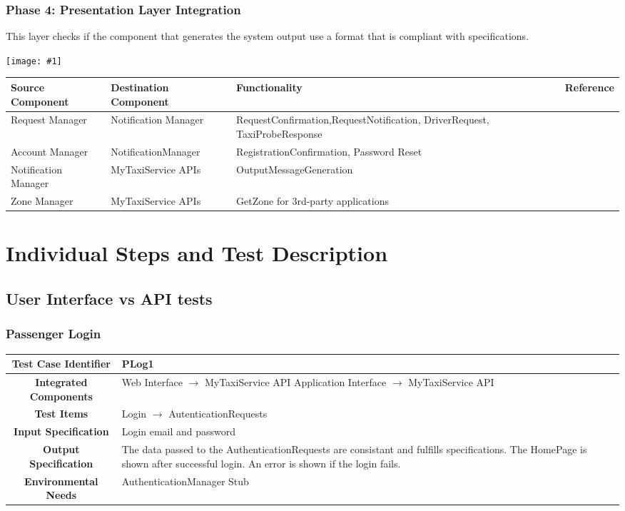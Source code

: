 \documentclass[11pt, a4paper,titlepage]{article}
\newcommand{\image}[1]{
	\begin{center}
		\noindent \texttt{[image: \#1]}
	\end{center}
}
\begin{document}
	\subsubsection{Phase 4: Presentation Layer Integration}
	This layer checks if the component that generates the system output use a format that is compliant with specifications.
	\newline
	\image{test_phase4.png}
	\begin{tabularx}{\textwidth}{| X |X |X |c|}
		\hline \textbf{Source Component} &\textbf{ Destination Component}&\textbf{Functionality} & \textbf{Reference} \\
		\hline Request Manager & Notification Manager & RequestConfirmation,\newline RequestNotification, DriverRequest,  TaxiProbeResponse & \\
		\hline Account Manager & NotificationManager & RegistrationConfirmation, Password Reset &\\
		\hline Notification Manager & MyTaxiService APIs & OutputMessageGeneration &\\
		\hline Zone Manager & MyTaxiService APIs & GetZone for 3rd-party applications &\\
		\hline
	\end{tabularx}	
	\newpage
	\section{Individual Steps and Test Description}
	\subsection{User Interface vs API tests}
	\subsubsection{Passenger Login}
	\begin{tabularx}{\textwidth}{| c|X|}
		\hline \textbf{Test Case Identifier} & \label{PLog1}PLog1 \\
		\hline \textbf{Integrated Components} & Web Interface $\rightarrow $ MyTaxiService API \newline 
		Application Interface $\rightarrow $ MyTaxiService API \\
		\hline \textbf{Test Items} & Login $\rightarrow $ AutenticationRequests	 \\
		\hline \textbf{Input Specification} & Login email and password \\
		\hline \textbf{Output Specification} & 
		The data passed to the AuthenticationRequests are consistant and fulfills specifications.\newline
		The HomePage is shown after successful login.\newline
		An error is shown if the login fails. \\
		\hline \textbf{Environmental Needs} & AuthenticationManager Stub
		\\
		\hline
	\end{tabularx}
	\newline
	\newline
\end{document}
